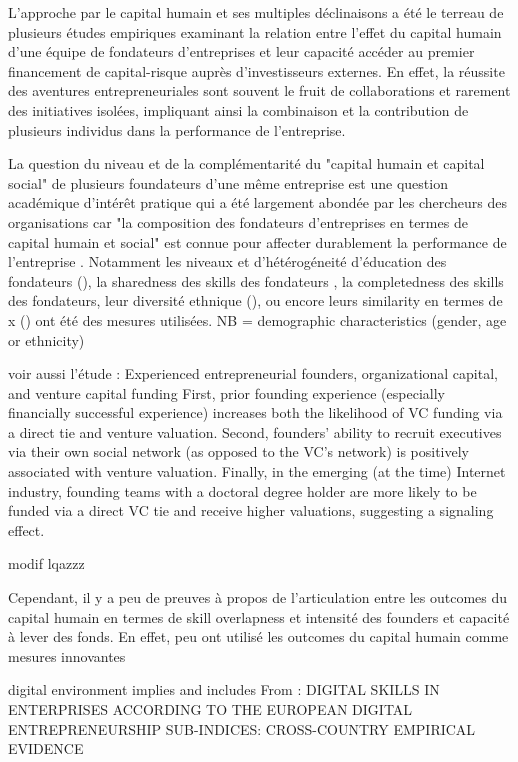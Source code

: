 \documentclass[11pt]{article}
\begin{document}
L'approche par le capital humain et ses multiples déclinaisons a été le terreau de plusieurs études empiriques examinant la relation entre l'effet du capital humain d'une équipe de fondateurs d'entreprises et leur capacité accéder au premier financement de capital-risque auprès d'investisseurs externes. En effet, la réussite des aventures entrepreneuriales sont souvent le fruit de collaborations et rarement des initiatives isolées, impliquant ainsi la combinaison et la contribution de plusieurs individus dans la performance de l'entreprise.

La question du niveau et de la complémentarité du "capital humain et capital social" de plusieurs foundateurs d'une même entreprise est une question académique d'intérêt pratique qui a été largement abondée par les chercheurs des organisations car "la composition des fondateurs d'entreprises en termes de capital humain et social" est connue pour affecter durablement la performance de l'entreprise \citet{colombo2005founders, unger2011human}. Notamment les niveaux et d'hétérogéneité d'éducation des fondateurs (\citet{pinelli2020too}), la sharedness des skills des fondateurs \citet{reese2020should}, la completedness des skills des fondateurs, leur diversité ethnique (\citet{wise2022startup}), ou encore leurs similarity en termes de x (\citet{singhal2022data}) ont été des mesures utilisées. NB = demographic characteristics (gender, age or ethnicity)

voir aussi l'étude : Experienced entrepreneurial founders, organizational capital, and venture capital funding
First, prior founding experience (especially financially successful experience) increases both the likelihood of VC funding via a direct tie and venture valuation. Second, founders’ ability to recruit executives via their own social network (as opposed to the VC’s network) is positively associated with venture valuation. Finally, in the emerging (at the time) Internet industry, founding teams with a doctoral degree holder are more likely to be funded via a direct VC tie and receive higher valuations, suggesting a signaling effect.

modif lqazzz


Cependant, il y a peu de preuves à propos de l'articulation entre les outcomes du capital humain en termes de skill overlapness et intensité des founders et capacité à lever des fonds. En effet, peu ont utilisé les outcomes du capital humain comme mesures innovantes \citep{marvel2016human}

digital environment implies and includes
From : DIGITAL SKILLS IN ENTERPRISES ACCORDING TO THE EUROPEAN DIGITAL ENTREPRENEURSHIP SUB-INDICES: CROSS-COUNTRY EMPIRICAL EVIDENCE
\end{document}
